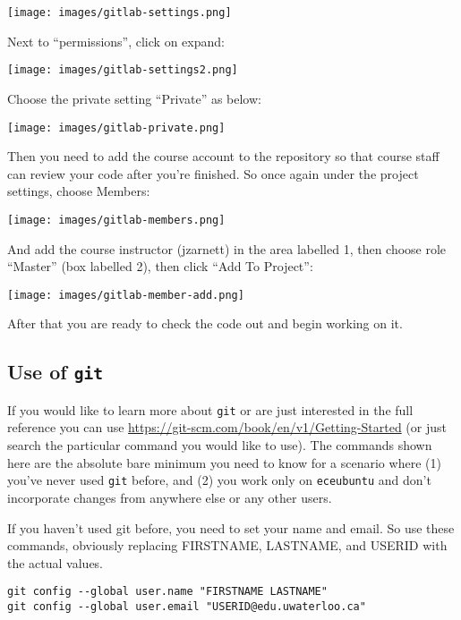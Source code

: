 \begin{center}
	\texttt{[image: images/gitlab-settings.png]}
\end{center}

Next to ``permissions'', click on expand:

\begin{center}
	\texttt{[image: images/gitlab-settings2.png]}
\end{center}

Choose the private setting ``Private'' as below:

\begin{center}
	\texttt{[image: images/gitlab-private.png]}
\end{center}

Then you need to add the course account to the repository so that course staff can review your code after you're finished. So once again under the project settings, choose Members:

\begin{center}
	\texttt{[image: images/gitlab-members.png]}
\end{center}

And add the course instructor (jzarnett) in the area labelled 1, then choose role ``Master'' (box labelled 2), then click ``Add To Project'':

\begin{center}
	\texttt{[image: images/gitlab-member-add.png]}
\end{center}

After that you are ready to check the code out and begin working on it.


\subsection*{Use of \texttt{git}}
If you would like to learn more about \texttt{git} or are just interested in the full reference you can use \url{https://git-scm.com/book/en/v1/Getting-Started} (or just search the particular command you would like to use). The commands shown here are the absolute bare minimum you need to know for a scenario where (1) you've never used \texttt{git} before, and (2) you work only on \texttt{eceubuntu} and don't incorporate changes from anywhere else or any other users.

If you haven't used git before, you need to set your name and email. So use these commands, obviously replacing FIRSTNAME, LASTNAME, and USERID with the actual values.
\begin{lstlisting}
git config --global user.name "FIRSTNAME LASTNAME"
git config --global user.email "USERID@edu.uwaterloo.ca"
\end{lstlisting}

